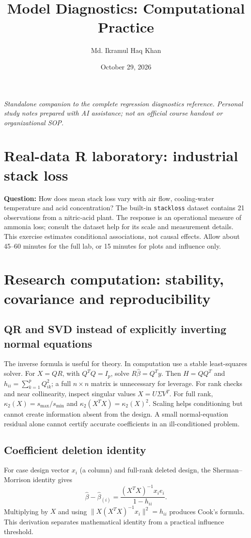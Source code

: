 \documentclass[11pt]{article}
\title{Model Diagnostics: Computational Practice}
\author{Md. Ikramul Haq Khan}
\date{October 29, 2026}
\begin{document}
\maketitle
\textit{Standalone companion to the complete regression diagnostics reference. Personal study notes prepared with AI assistance; not an official course handout or organizational SOP.}
\section{Real-data R laboratory: industrial stack loss}
\textbf{Question:} How does mean stack loss vary with air flow, cooling-water temperature and acid concentration? The built-in \texttt{stackloss} dataset contains 21 observations from a nitric-acid plant. The response is an operational measure of ammonia loss; consult the dataset help for its scale and measurement details. This exercise estimates conditional associations, not causal effects. Allow about 45--60 minutes for the full lab, or 15 minutes for plots and influence only.


\section{Research computation: stability, covariance and reproducibility}
\subsection{QR and SVD instead of explicitly inverting normal equations}
The inverse formula is useful for theory. In computation use a stable least-squares solver. For $X=QR$, with $Q^TQ=I_p$, solve $R\widehat\beta=Q^Ty$. Then $H=QQ^T$ and $h_{ii}=\sum_{k=1}^p Q_{ik}^2$; a full $n\times n$ matrix is unnecessary for leverage. For rank checks and near collinearity, inspect singular values $X=U\Sigma V^T$. For full rank, $\kappa_2(X)=s_{\max}/s_{\min}$ and $\kappa_2(X^TX)=\kappa_2(X)^2$. Scaling helps conditioning but cannot create information absent from the design. A small normal-equation residual alone cannot certify accurate coefficients in an ill-conditioned problem.
\subsection{Coefficient deletion identity}
For case design vector $x_i$ (a column) and full-rank deleted design, the Sherman--Morrison identity gives
\[\widehat\beta-\widehat\beta_{(i)}
=\frac{(X^TX)^{-1}x_i e_i}{1-h_{ii}}.\]
Multiplying by $X$ and using $\|X(X^TX)^{-1}x_i\|^2=h_{ii}$ produces Cook's formula. This derivation separates mathematical identity from a practical influence threshold.
\end{document}
